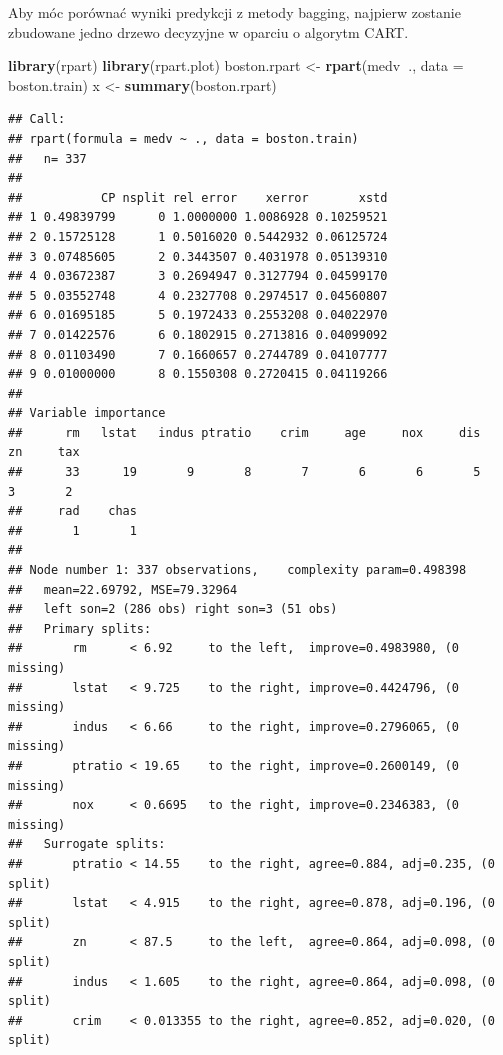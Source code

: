 \documentclass[
]{book}
\newenvironment{Shaded}{\begin{snugshade}}{\end{snugshade}}
\newcommand{\DataTypeTok}[1]{\textcolor[rgb]{0.13,0.29,0.53}{#1}}
\newcommand{\KeywordTok}[1]{\textcolor[rgb]{0.13,0.29,0.53}{\textbf{#1}}}
\newcommand{\NormalTok}[1]{#1}
\newcommand{\OperatorTok}[1]{\textcolor[rgb]{0.81,0.36,0.00}{\textbf{#1}}}
\newcommand{\StringTok}[1]{\textcolor[rgb]{0.31,0.60,0.02}{#1}}
\theoremstyle{plain}
\theoremstyle{definition}
\theoremstyle{definition}
\theoremstyle{definition}
\theoremstyle{definition}
\theoremstyle{remark}
\begin{document}
Aby móc porównać wyniki predykcji z metody bagging, najpierw zostanie zbudowane jedno drzewo decyzyjne w oparciu o algorytm CART.

\begin{Shaded}
\begin{Highlighting}[]
\KeywordTok{library}\NormalTok{(rpart)}
\KeywordTok{library}\NormalTok{(rpart.plot)}
\NormalTok{boston.rpart <-}\StringTok{ }\KeywordTok{rpart}\NormalTok{(medv}\OperatorTok{~}\NormalTok{., }\DataTypeTok{data =}\NormalTok{ boston.train)}
\NormalTok{x <-}\StringTok{ }\KeywordTok{summary}\NormalTok{(boston.rpart)}
\end{Highlighting}
\end{Shaded}

\begin{verbatim}
## Call:
## rpart(formula = medv ~ ., data = boston.train)
##   n= 337 
## 
##           CP nsplit rel error    xerror       xstd
## 1 0.49839799      0 1.0000000 1.0086928 0.10259521
## 2 0.15725128      1 0.5016020 0.5442932 0.06125724
## 3 0.07485605      2 0.3443507 0.4031978 0.05139310
## 4 0.03672387      3 0.2694947 0.3127794 0.04599170
## 5 0.03552748      4 0.2327708 0.2974517 0.04560807
## 6 0.01695185      5 0.1972433 0.2553208 0.04022970
## 7 0.01422576      6 0.1802915 0.2713816 0.04099092
## 8 0.01103490      7 0.1660657 0.2744789 0.04107777
## 9 0.01000000      8 0.1550308 0.2720415 0.04119266
## 
## Variable importance
##      rm   lstat   indus ptratio    crim     age     nox     dis      zn     tax 
##      33      19       9       8       7       6       6       5       3       2 
##     rad    chas 
##       1       1 
## 
## Node number 1: 337 observations,    complexity param=0.498398
##   mean=22.69792, MSE=79.32964 
##   left son=2 (286 obs) right son=3 (51 obs)
##   Primary splits:
##       rm      < 6.92     to the left,  improve=0.4983980, (0 missing)
##       lstat   < 9.725    to the right, improve=0.4424796, (0 missing)
##       indus   < 6.66     to the right, improve=0.2796065, (0 missing)
##       ptratio < 19.65    to the right, improve=0.2600149, (0 missing)
##       nox     < 0.6695   to the right, improve=0.2346383, (0 missing)
##   Surrogate splits:
##       ptratio < 14.55    to the right, agree=0.884, adj=0.235, (0 split)
##       lstat   < 4.915    to the right, agree=0.878, adj=0.196, (0 split)
##       zn      < 87.5     to the left,  agree=0.864, adj=0.098, (0 split)
##       indus   < 1.605    to the right, agree=0.864, adj=0.098, (0 split)
##       crim    < 0.013355 to the right, agree=0.852, adj=0.020, (0 split)

\end{verbatim}
\end{document}
